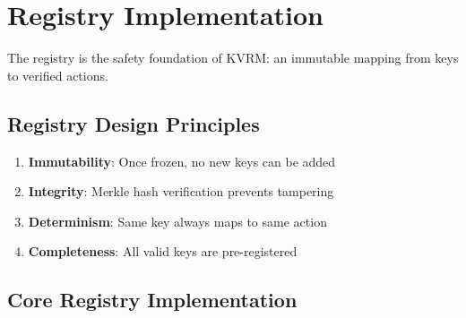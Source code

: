 \documentclass[11pt,a4paper]{article}
\begin{document}
\section{Registry Implementation}

The registry is the safety foundation of KVRM: an immutable mapping from keys to verified actions.

\subsection{Registry Design Principles}

\begin{enumerate}
    \item \textbf{Immutability}: Once frozen, no new keys can be added
    \item \textbf{Integrity}: Merkle hash verification prevents tampering
    \item \textbf{Determinism}: Same key always maps to same action
    \item \textbf{Completeness}: All valid keys are pre-registered
\end{enumerate}

\subsection{Core Registry Implementation}
\end{document}
